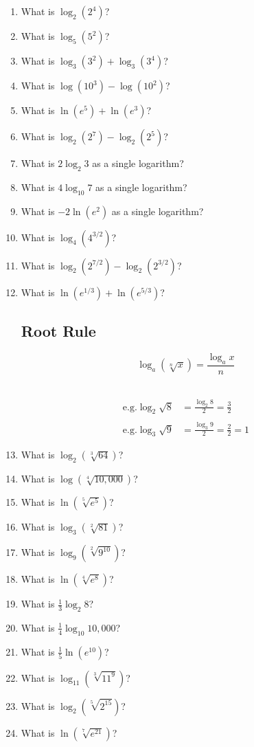 \documentclass[12pt]{article}
\begin{document}
\begin{enumerate}
\item What is $\log_2{(2^4)}$?
\item What is $\log_5{(5^2)}$?
\item What is $\log_3{(3^2)} + \log_3{(3^4)}$?
\item What is $\log{(10^3)} - \log{(10^2)}$?
\item What is $\ln{(e^5)} + \ln{(e^3)}$?
\item What is $\log_2{(2^7)} - \log_2{(2^5)}$?
\item What is $2\log_2{3}$ as a single logarithm?
\item What is $4\log_{10}{7}$ as a single logarithm?
\item What is $-2\ln{(e^2)}$ as a single logarithm?
\item What is $\log_4{(4^{3/2})}$?
\item What is $\log_{2}{(2^{7/2})} - \log_{2}{(2^{3/2})}$?
\item What is $\ln{(e^{1/3})} + \ln{(e^{5/3})}$?

\subsection*{Root Rule}
\begin{Large}
$$\log_a{(\sqrt[n]{x})}=\frac{\log_a{x}}{n}$$
\end{Large}
\\

\begin{align*}
\text{e.g.}
\log_2{\sqrt{8}}&=\frac{\log_2{8}}{2}=\frac{3}{2}\\
\\
\text{e.g.}
\log_3{\sqrt{9}}&=\frac{\log_3{9}}{2}=\frac{2}{2}=1
\end{align*}

\item What is $\log_2{(\sqrt[3]{64})}$?
\item What is $\log{(\sqrt[4]{10,000})}$?
\item What is $\ln{(\sqrt[5]{e^5})}$?
\item What is $\log_3{(\sqrt[2]{81})}$?
\item What is $\log_{9}{(\sqrt[2]{9^{10}})}$?
\item What is $\ln{(\sqrt[4]{e^8})}$?
\item What is $\frac{1}{3}\log_2{8}$?
\item What is $\frac{1}{4}\log_{10}{10,000}$?
\item What is $\frac{1}{5}\ln{(e^{10})}$?
\item What is $\log_{11}{(\sqrt[3]{11^{9}})}$?
\item What is $\log_{2}{(\sqrt[5]{2^{15}})}$?
\item What is $\ln{(\sqrt[7]{e^{21}})}$?


\end{enumerate}
\end{document}
